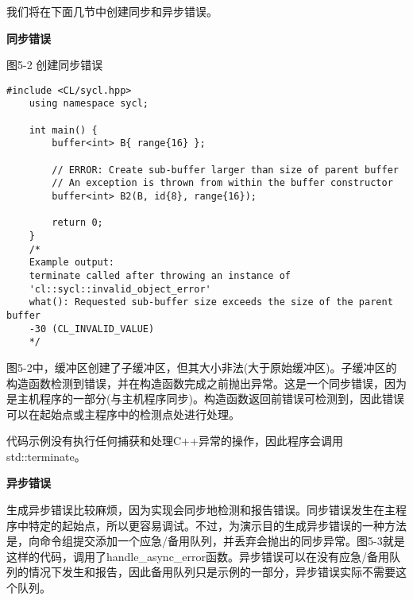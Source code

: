 我们将在下面几节中创建同步和异步错误。\par

\hspace*{\fill} \par %
\textbf{同步错误}

\hspace*{\fill} \par %
图5-2 创建同步错误
\begin{lstlisting}[caption={}]
	#include <CL/sycl.hpp>
	using namespace sycl;
	
	int main() {
		buffer<int> B{ range{16} };
		
		// ERROR: Create sub-buffer larger than size of parent buffer
		// An exception is thrown from within the buffer constructor
		buffer<int> B2(B, id{8}, range{16});
		
		return 0;
	}
	/*
	Example output:
	terminate called after throwing an instance of 
	'cl::sycl::invalid_object_error'
	what(): Requested sub-buffer size exceeds the size of the parent buffer 
	-30 (CL_INVALID_VALUE)
	*/
\end{lstlisting}

图5-2中，缓冲区创建了子缓冲区，但其大小非法(大于原始缓冲区)。子缓冲区的构造函数检测到错误，并在构造函数完成之前抛出异常。这是一个同步错误，因为是主机程序的一部分(与主机程序同步)。构造函数返回前错误可检测到，因此错误可以在起始点或主程序中的检测点处进行处理。\par

代码示例没有执行任何捕获和处理C++异常的操作，因此程序会调用std::terminate。\par

\hspace*{\fill} \par %
\textbf{异步错误}

生成异步错误比较麻烦，因为实现会同步地检测和报告错误。同步错误发生在主程序中特定的起始点，所以更容易调试。不过，为演示目的生成异步错误的一种方法是，向命令组提交添加一个应急/备用队列，并丢弃会抛出的同步异常。图5-3就是这样的代码，调用了handle\_async\_error函数。异步错误可以在没有应急/备用队列的情况下发生和报告，因此备用队列只是示例的一部分，异步错误实际不需要这个队列。\par

